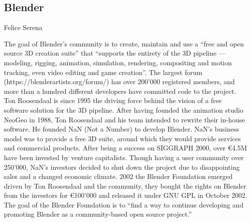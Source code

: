 \subsection{Blender}{Felice Serena}

The goal of Blender's community is to create, maintain and use a ``free and open source 3D creation suite'' that ``supports the entirety of the 3D pipeline — modeling, rigging, animation, simulation, rendering, compositing and motion tracking, even video editing and game creation''. 
The largest forum (https://blenderartists.org/forum/) has over 200'000 registered members, and more than a hundred different developers have committed code to the project. 
Ton Roosendaal is since 1995 the driving force behind the vision of a free software solution for the 3D pipeline. 
After having founded the animation studio NeoGeo in 1988\cite{blender-manual-history}, Ton Roosendaal and his team intended to rewrite their in-house software. 
He founded NaN (Not a Number) to develop Blender. 
NaN's business model was to provide a free 3D suite, around which they would provide services and commercial products. 
After being a success on SIGGRAPH 2000, over €4.5M have been invested by venture capitalists. 
Though having a user community over 250'000, NaN's investors decided to shut down the project due to disappointing sales and a changed economic climate. 
2002 the Blender Foundation emerged driven by Ton Roosendaal and the community, they bought the rights on Blender from the investors for €100'000 and released it under GNU GPL\cite{blender-license} in October 2002. 
The goal of the Blender Foundation is to ``find a way to continue developing and promoting Blender as a community-based open source project.'' \cite{blender-official-history}

